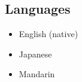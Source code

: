 \subsection*{Languages}
\begin{itemize}
    \item[$\circ$] English (native)
    \item[$\circ$] Japanese
    \item[$\circ$] Mandarin
\end{itemize}
